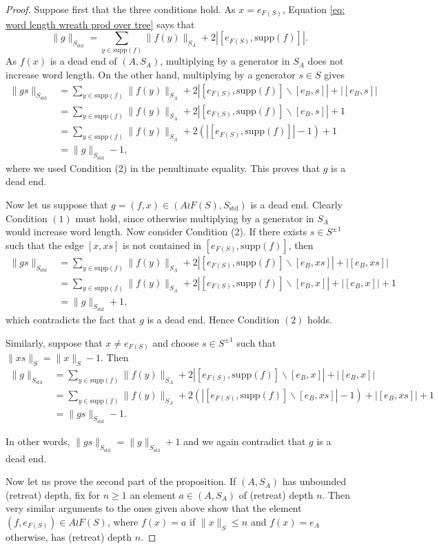 \documentclass[reqno,oneside]{amsart}
\newcommand{\supp}[1]{\mathrm{supp}(#1)}
\newcommand{\std}{S_{\mathrm{std}}}
\theoremstyle{plain}
\theoremstyle{definition}
\begin{document}
\begin{proof}
	Suppose first that the three conditions hold. As $x=e_{F(S)}$, Equation \eqref{eq: word length wreath prod over tree} says that
	$$
	\|g\|_{\std}=\sum_{y\in \supp{f}}\|f(y)\|_{S_A}+2|[e_{F(S)},\supp{f}]|.
	$$
	As $f(x)$ is a dead end of $(A,S_A)$, multiplying by a generator in $S_A$ does not increase word length. On the other hand, multiplying by a generator $s\in S$ gives
	\begin{align*}
	\|gs\|_{\std}&=\sum_{y\in \supp{f}}\|f(y)\|_{S_A}+2|[e_{F(S)},\supp{f}]\backslash[e_B,s]|+|[e_B,s]|\\
	&=\sum_{y\in \supp{f}}\|f(y)\|_{S_A}+2|[e_{F(S)},\supp{f}]\backslash[e_B,s]|+1\\
	&=\sum_{y\in \supp{f}}\|f(y)\|_{S_A}+2\left(|[e_{F(S)},\supp{f}]|-1\right)+1\\
	&=\|g\|_{\std}-1,
	\end{align*}
	where we used Condition (2) in the penultimate equality. This proves that $g$ is a dead end.
	
	
	
	Now let us suppose that $g=(f,x)\in (A\wr F(S),\std)$ is a dead end. Clearly Condition $(1)$ must hold, since otherwise multiplying by a generator in $S_A$ would increase word length. Now consider Condition (2). If there exists $s\in S^{\pm 1}$ such that the edge $[x,xs]$ is not contained in $[e_{F(S)},\supp{f}]$, then 
	\begin{align*}
	\|gs\|_{\std}&=\sum_{y\in \supp{f}}\|f(y)\|_{S_A}+2|[e_{F(S)},\supp{f}]\backslash[e_B,xs]|+|[e_B,xs]|\\
	&=\sum_{y\in \supp{f}}\|f(y)\|_{S_A}+2|[e_{F(S)},\supp{f}]\backslash[e_B,x]|+|[e_B,x]|+1\\
	&=\|g\|_{\std}+1,
	\end{align*}
	which contradicts the fact that $g$ is a dead end. Hence Condition $(2)$ holds.
	
	Similarly, suppose that $x\neq e_{F(S)}$ and choose $s\in S^{\pm 1}$ such that $\|xs\|_{S}=\|x\|_{S}-1$. Then
	\begin{align*}
	\|g\|_{\std}&=\sum_{y\in \supp{f}}\|f(y)\|_{S_A}+2|[e_{F(S)},\supp{f}]\backslash[e_B,x]|+|[e_B,x]|\\
	&=\sum_{y\in \supp{f}}\|f(y)\|_{S_A}+2\left(|[e_{F(S)},\supp{f}]\backslash[e_B,xs]|-1\right)+|[e_B,xs]|+1\\
	&=\|gs\|_{\std}-1.
	\end{align*}
	
	In other words, $\|gs\|_{\std}=\|g\|_{\std}+1$ and we again contradict that $g$ is a dead end.
	
	Now let us prove the second part of the proposition. If $(A,S_A)$ has unbounded (retreat) depth, fix for $n\ge 1$ an element $a\in (A,S_A)$ of (retreat) depth $n$. Then very similar arguments to the ones given above show that the element $(f,e_{F(S)})\in A\wr F(S)$, where $f(x)=a$ if $\|x\|_S\le n$ and $f(x)=e_A$ otherwise, has (retreat) depth $n$.
\end{proof}
\end{document}
